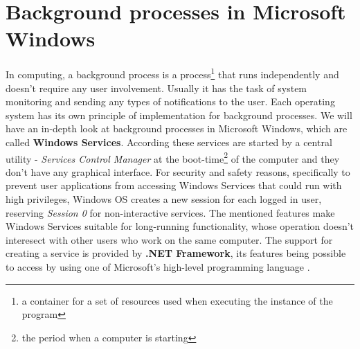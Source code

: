 \section{Background processes in Microsoft Windows}
\label{section:backgroundProc}
In computing, a background process is a process\footnote{a container for a set of resources used when executing the instance of the program} that runs independently and doesn't require any user involvement. Usually it has the task of system monitoring and sending any types of notifications to the user. Each operating system has its own principle of implementation for background processes. We will have an in-depth look at background processes in Microsoft Windows, which are called \textbf{Windows Services}. According \cite{winInternals} these services are started by a central utility - \textit{Services Control Manager} at the boot-time\footnote{the period when a computer is starting} of the computer and they don't have any graphical interface. For security and safety reasons, specifically to prevent user applications from accessing Windows Services that could run with high privileges, Windows OS creates a new session for each logged in user, reserving \textit{Session 0} for non-interactive services. The mentioned features make Windows Services suitable for long-running functionality, whose operation doesn't interesect with other users who work on the same computer. The support for creating a service is provided by \textbf{.NET Framework}, its features being possible to access by using one of Microsoft's high-level programming language \CSharp.

